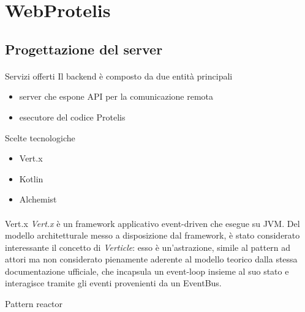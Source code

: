 \section{WebProtelis}

    \subsection{Progettazione del server}
      \begin{frame}{\insertsectionhead}
        \framesubtitle{\insertsubsectionhead}

        \begin{block}{Servizi offerti}
          Il backend è composto da due entità principali
          \begin{itemize}
            \item server che espone API per la comunicazione remota
            \item esecutore del codice Protelis
          \end{itemize}
        \end{block}

        \begin{block}{Scelte tecnologiche}
          \begin{itemize}
            \item Vert.x      %
            \item Kotlin      %
            \item Alchemist   %
          \end{itemize}
        \end{block}
      \end{frame}

      \begin{frame}{\insertsectionhead}
        \framesubtitle{\insertsubsectionhead}

        \begin{block}{Vert.x}
          \emph{Vert.x} è un framework applicativo event-driven che esegue su JVM.
          Del modello architetturale messo a disposizione dal framework, è stato considerato interessante il concetto di \emph{Verticle}:
          esso è un'astrazione, simile al pattern ad attori ma non considerato pienamente aderente al modello teorico dalla stessa documentazione ufficiale,
          che incapsula un event-loop insieme al suo stato e interagisce tramite gli eventi provenienti da un EventBus.
        \end{block}


        \begin{block}{Pattern reactor}
        \end{block}
      \end{frame}

